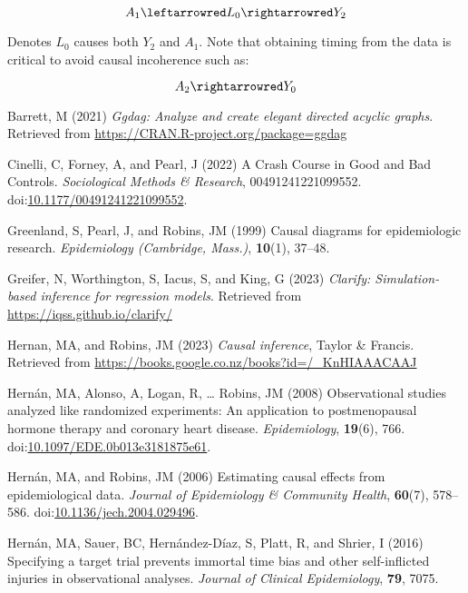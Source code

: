 \documentclass[
  singlecolumn]{article}
\newlength{\cslhangindent}
\newenvironment{CSLReferences}[2] %
 {\begin{list}{}{%
  \setlength{\itemindent}{0pt}
  \setlength{\leftmargin}{0pt}
  \setlength{\parsep}{0pt}
  \ifodd #1
   \setlength{\leftmargin}{\cslhangindent}
   \setlength{\itemindent}{-1\cslhangindent}
  \fi
  \setlength{\itemsep}{#2\baselineskip}}}
 {\end{list}}
\begin{document}
\[ A_1 \leftarrowred L_0 \rightarrowred Y_2 \]

Denotes \(L_0\) causes both \(Y_2\) and \(A_1\). Note that obtaining
timing from the data is critical to avoid causal incoherence such as:

\[ A_2 \rightarrowred Y_0 \]

\label{refs}
\begin{CSLReferences}{1}{0}
Barrett, M (2021) \emph{Ggdag: Analyze and create elegant directed
acyclic graphs}. Retrieved from
\url{https://CRAN.R-project.org/package=ggdag}

Cinelli, C, Forney, A, and Pearl, J (2022) A Crash Course in Good and
Bad Controls. \emph{Sociological Methods \& Research},
00491241221099552.
doi:\href{https://doi.org/10.1177/00491241221099552}{10.1177/00491241221099552}.

Greenland, S, Pearl, J, and Robins, JM (1999) Causal diagrams for
epidemiologic research. \emph{Epidemiology (Cambridge, Mass.)},
\textbf{10}(1), 37--48.

Greifer, N, Worthington, S, Iacus, S, and King, G (2023) \emph{Clarify:
Simulation-based inference for regression models}. Retrieved from
\url{https://iqss.github.io/clarify/}

Hernan, MA, and Robins, JM (2023) \emph{Causal inference}, Taylor \&
Francis. Retrieved from
\url{https://books.google.co.nz/books?id=/_KnHIAAACAAJ}

Hernán, MA, Alonso, A, Logan, R, \ldots{} Robins, JM (2008)
Observational studies analyzed like randomized experiments: An
application to postmenopausal hormone therapy and coronary heart
disease. \emph{Epidemiology}, \textbf{19}(6), 766.
doi:\href{https://doi.org/10.1097/EDE.0b013e3181875e61}{10.1097/EDE.0b013e3181875e61}.

Hernán, MA, and Robins, JM (2006) Estimating causal effects from
epidemiological data. \emph{Journal of Epidemiology \& Community
Health}, \textbf{60}(7), 578--586.
doi:\href{https://doi.org/10.1136/jech.2004.029496}{10.1136/jech.2004.029496}.

Hernán, MA, Sauer, BC, Hernández-Díaz, S, Platt, R, and Shrier, I (2016)
Specifying a target trial prevents immortal time bias and other
self-inflicted injuries in observational analyses. \emph{Journal of
Clinical Epidemiology}, \textbf{79}, 7075.


\end{CSLReferences}
\end{document}
